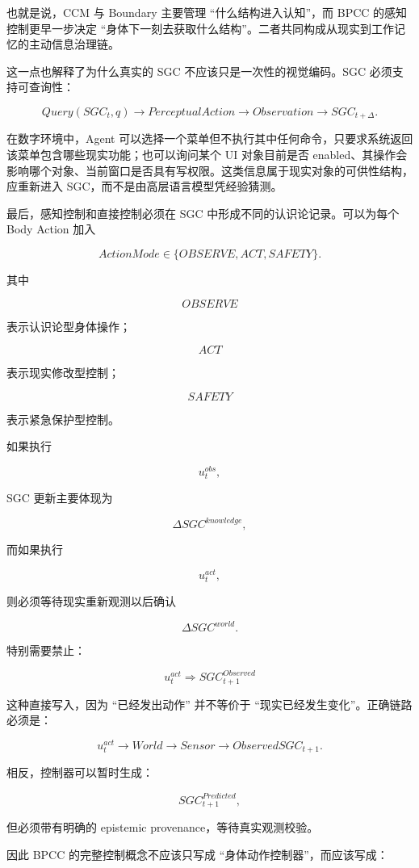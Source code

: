 也就是说，CCM 与 Boundary 主要管理 ``什么结构进入认知''，而 BPCC 的感知控制更早一步决定 ``身体下一刻去获取什么结构''。二者共同构成从现实到工作记忆的主动信息治理链。

这一点也解释了为什么真实的 SGC 不应该只是一次性的视觉编码。SGC 必须支持可查询性：

\[
Query(SGC_t,q)
\rightarrow
PerceptualAction
\rightarrow
Observation
\rightarrow
SGC_{t+\Delta}.
\]

在数字环境中，Agent 可以选择一个菜单但不执行其中任何命令，只要求系统返回该菜单包含哪些现实功能；也可以询问某个 UI 对象目前是否 enabled、其操作会影响哪个对象、当前窗口是否具有写权限。这类信息属于现实对象的可供性结构，应重新进入 SGC，而不是由高层语言模型凭经验猜测。

最后，感知控制和直接控制必须在 SGC 中形成不同的认识论记录。可以为每个 Body Action 加入

\[
ActionMode
\in
\{
OBSERVE,
ACT,
SAFETY
\}.
\]

其中

\[
OBSERVE
\]

表示认识论型身体操作；

\[
ACT
\]

表示现实修改型控制；

\[
SAFETY
\]

表示紧急保护型控制。

如果执行

\[
u_t^{obs},
\]

SGC 更新主要体现为

\[
\Delta SGC^{knowledge},
\]

而如果执行

\[
u_t^{act},
\]

则必须等待现实重新观测以后确认

\[
\Delta SGC^{world}.
\]

特别需要禁止：

\[
u_t^{act}
\Rightarrow
SGC_{t+1}^{Observed}
\]

这种直接写入，因为 ``已经发出动作'' 并不等价于 ``现实已经发生变化''。正确链路必须是：

\[
u_t^{act}
\rightarrow
World
\rightarrow
Sensor
\rightarrow
ObservedSGC_{t+1}.
\]

相反，控制器可以暂时生成：

\[
SGC_{t+1}^{Predicted},
\]

但必须带有明确的 epistemic provenance，等待真实观测校验。

因此 BPCC 的完整控制概念不应该只写成 ``身体动作控制器''，而应该写成：

